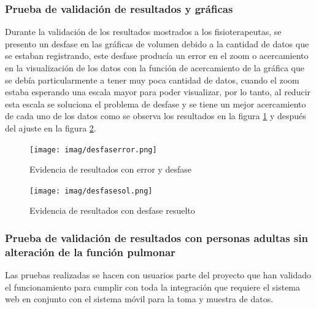 \documentclass[12pt]{article}
\begin{document}
\subsubsection{Prueba de validación de resultados y gráficas }

Durante la validación de los resultados mostrados a los fisioterapeutas, se presento un desfase en las gráficas de volumen debido a la cantidad de datos que se estaban registrando, este desfase producía un error en el zoom o acercamiento en la visualización de los datos con la función de acercamiento de la gráfica que se debía particularmente a tener muy poca cantidad de datos, cuando el zoom estaba esperando una escala mayor para poder visualizar, por lo tanto, al reducir esta escala se soluciona el problema de desfase y se tiene un mejor acercamiento de cada uno de los datos como se observa los resultados en la figura \ref{52} y después del ajuste en la figura \ref{53}.


\begin{figure}[ht]
\centering
\texttt{[image: imag/desfaserror.png]}
\caption{Evidencia de resultados con error y desfase  }
\label{52}
\end{figure}
\FloatBarrier



\begin{figure}[ht]
\centering
\texttt{[image: imag/desfasesol.png]}
\caption{Evidencia de resultados con desfase resuelto }
\label{53}
\end{figure}
\FloatBarrier



\subsubsection{Prueba de validación de resultados con personas adultas sin alteración de la función pulmonar }

Las pruebas realizadas se hacen con usuarios parte del proyecto que han validado el funcionamiento para cumplir con toda la integración que requiere el sistema web en conjunto con el sistema móvil para la toma y muestra de datos. 
\end{document}
